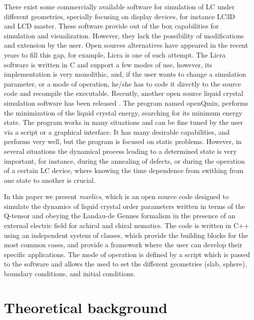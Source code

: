 \documentclass[final,5p,times,twocolumn]{elsarticle}
\begin{document}
There exist some commercially available software for simulation of LC under different geometries, specially focusing on display devices, for instance LC3D~\cite{anderson2001lc3d} and LCD
master\cite{LCDMaster}. These software provide out of the box capabilities for simulation and visualization. However, they lack the
possibility of modifications and extension by the user. Open sources alternatives have appeared in the recent years to fill this gap, for example, Licra \cite{Licra} is one of such
attempt. The Licra software is written in C and support a few modes of
use, however, its implementation is very monolithic, and, if the user
wants to change a simulation parameter, or a mode of operation, he/she
has to code it directly to the source code and recompile the
executable. Recently, another open source liquid crystal simulation
software has been released \cite{Sussman2019}. The program named
openQmin, performs the minimization of the liquid crystal energy,
searching for its minimum energy state. The program works in many
situations and can be fine tuned by the user via a script or a
graphical interface.  It has many desirable capabilities, and performs
very well, but the program is focused on static problems. However, in several situations the dynamical process leading to a determined state is very important, for instance, during the annealing of defects, or during the operation of a certain LC device, where knowing the time dependence from swithing from one state to another is crucial.

In this paper we present \textit{marlics}, which is an open source code
designed to simulate the dynamics of liquid crystal order
parameters written in terms of the Q-tensor and obeying the Landau-de Gennes formalism in the presence of an external electric field for achiral and chiral nematics. The code is written in C++ using an independent
system of classes, which provide the building blocks for the most
common cases, and provide a framework where the user can develop their
specific applications. The mode of operation is defined by a script which is passed to the software and allows the used to set the different geometries (slab, sphere), boundary conditions, and initial conditions.

\section{Theoretical background}
\end{document}
